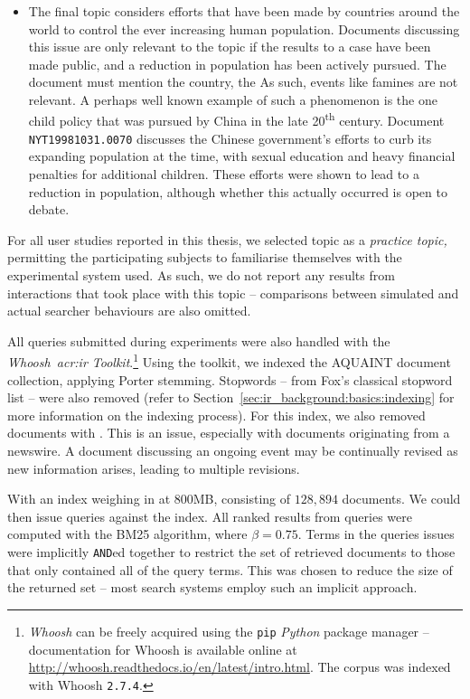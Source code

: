 \begin{itemize}
    \item[]{ The final topic considers efforts that have been made by countries around the world to control the ever increasing human population. Documents discussing this issue are only relevant to the topic if the results to a case have been made public, and a reduction in population has been actively pursued. The document must mention the country, the As such, events like famines are not relevant. A perhaps well known example of such a phenomenon is the one child policy that was pursued by China in the late 20\textsuperscript{th} century. Document \texttt{NYT19981031.0070} discusses the Chinese government's efforts to curb its expanding population at the time, with sexual education and heavy financial penalties for additional children. These efforts were shown to lead to a reduction in population, although whether this actually occurred is open to debate.}
    
\end{itemize}

For all user studies reported in this thesis, we selected topic  as a \emph{practice topic,} permitting the participating subjects to familiarise themselves with the experimental system used. As such, we do not report any results from interactions that took place with this topic -- comparisons between simulated and actual searcher behaviours are also omitted. 

All queries submitted during experiments were also handled with the \emph{Whoosh~\gls{acr:ir} Toolkit}.\footnote{\emph{Whoosh} can be freely acquired using the \texttt{pip} \emph{Python} package manager -- documentation for Whoosh is available online at \url{http://whoosh.readthedocs.io/en/latest/intro.html}.  The corpus was indexed with Whoosh \texttt{2.7.4}.} Using the toolkit, we indexed the AQUAINT document collection, applying Porter stemming. Stopwords -- from Fox's classical stopword list -- were also removed (refer to Section~\ref{sec:ir_background:basics:indexing} for more information on the indexing process). For this index, we also removed documents with . This is an issue, especially with documents originating from a newswire. A document discussing an ongoing event may be continually revised as new information arises, leading to multiple revisions. 

With an index weighing in at 800MB, consisting of $128,894$ documents.  We could then issue queries against the index. All ranked results from queries were computed with the BM25 algorithm, where $\beta=0.75$. Terms in the queries issues were implicitly \texttt{AND}ed together to restrict the set of retrieved documents to those that only contained all of the query terms. This was chosen to reduce the size of the returned set -- most search systems employ such an implicit approach.

